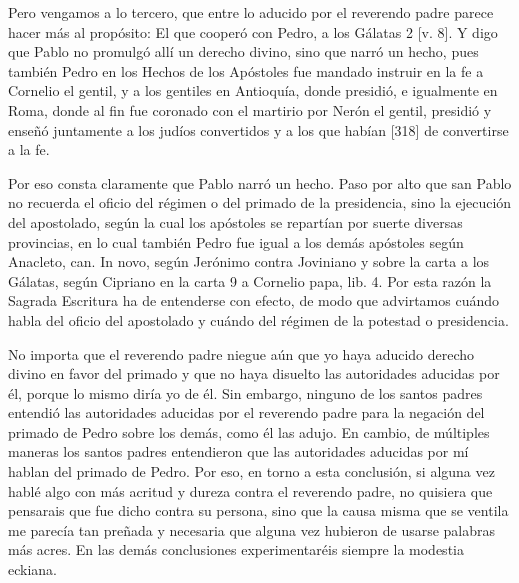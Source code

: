 Pero vengamos a lo tercero, que entre lo aducido por el reverendo padre parece hacer más al propósito: El que cooperó con Pedro, a los Gálatas 2 [v. 8]. Y digo que Pablo no promulgó allí un derecho divino, sino que narró un hecho, pues también Pedro en los Hechos de los Apóstoles fue mandado instruir en la fe a Cornelio el gentil, y a los gentiles en Antioquía, donde presidió, e igualmente en Roma, donde al fin fue coronado con el martirio por Nerón el gentil, presidió y enseñó juntamente a los judíos convertidos y a los que habían [318] de convertirse a la fe.

Por eso consta claramente que Pablo narró un hecho. Paso por alto que san Pablo no recuerda el oficio del régimen o del primado de la presidencia, sino la ejecución del apostolado, según la cual los apóstoles se repartían por suerte diversas provincias, en lo cual también Pedro fue igual a los demás apóstoles según Anacleto, can. In novo, según Jerónimo contra Joviniano y sobre la carta a los Gálatas, según Cipriano en la carta 9 a Cornelio papa, lib. 4. Por esta razón la Sagrada Escritura ha de entenderse con efecto, de modo que advirtamos cuándo habla del oficio del apostolado y cuándo del régimen de la potestad o presidencia.

No importa que el reverendo padre niegue aún que yo haya aducido derecho divino en favor del primado y que no haya disuelto las autoridades aducidas por él, porque lo mismo diría yo de él. Sin embargo, ninguno de los santos padres entendió las autoridades aducidas por el reverendo padre para la negación del primado de Pedro sobre los demás, como él las adujo. En cambio, de múltiples maneras los santos padres entendieron que las autoridades aducidas por mí hablan del primado de Pedro. Por eso, en torno a esta conclusión, si alguna vez hablé algo con más acritud y dureza contra el reverendo padre, no quisiera que pensarais que fue dicho contra su persona, sino que la causa misma que se ventila me parecía tan preñada y necesaria que alguna vez hubieron de usarse palabras más acres. En las demás conclusiones experimentaréis siempre la modestia eckiana.

